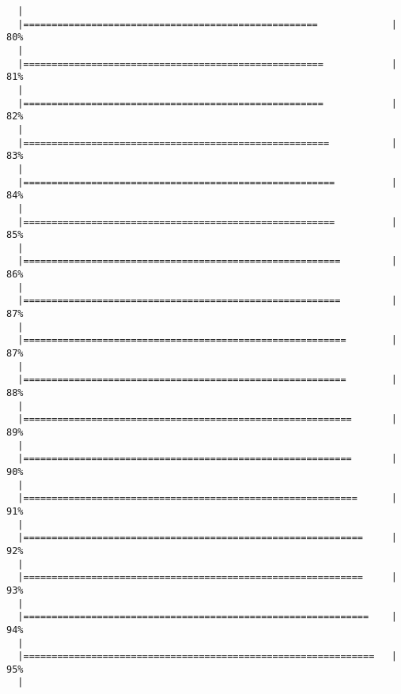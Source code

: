 \documentclass[]{article}
\begin{document}
\begin{verbatim}
  |                                                                       
  |====================================================             |  80%
  |                                                                       
  |=====================================================            |  81%
  |                                                                       
  |=====================================================            |  82%
  |                                                                       
  |======================================================           |  83%
  |                                                                       
  |=======================================================          |  84%
  |                                                                       
  |=======================================================          |  85%
  |                                                                       
  |========================================================         |  86%
  |                                                                       
  |========================================================         |  87%
  |                                                                       
  |=========================================================        |  87%
  |                                                                       
  |=========================================================        |  88%
  |                                                                       
  |==========================================================       |  89%
  |                                                                       
  |==========================================================       |  90%
  |                                                                       
  |===========================================================      |  91%
  |                                                                       
  |============================================================     |  92%
  |                                                                       
  |============================================================     |  93%
  |                                                                       
  |=============================================================    |  94%
  |                                                                       
  |==============================================================   |  95%
  |                                                                       

\end{verbatim}
\end{document}
